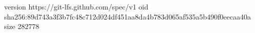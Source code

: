 version https://git-lfs.github.com/spec/v1
oid sha256:89d743a3f3b7fc48c712d024df451aa8da4b783d065af535a5b490f0eecaa40a
size 282778
